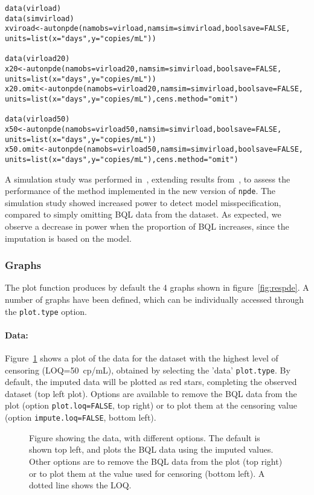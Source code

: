 \begin{verbatim}
data(virload)
data(simvirload)
xviroad<-autonpde(namobs=virload,namsim=simvirload,boolsave=FALSE, 
units=list(x="days",y="copies/mL"))

data(virload20)
x20<-autonpde(namobs=virload20,namsim=simvirload,boolsave=FALSE, 
units=list(x="days",y="copies/mL"))
x20.omit<-autonpde(namobs=virload20,namsim=simvirload,boolsave=FALSE, 
units=list(x="days",y="copies/mL"),cens.method="omit")

data(virload50)
x50<-autonpde(namobs=virload50,namsim=simvirload,boolsave=FALSE, 
units=list(x="days",y="copies/mL"))
x50.omit<-autonpde(namobs=virload50,namsim=simvirload,boolsave=FALSE, 
units=list(x="days",y="copies/mL"),cens.method="omit")
\end{verbatim}

A simulation study was performed in~\cite{Nguyen2012}, extending results from~\cite{Nguyen2012}, to assess the performance of the method implemented in the new version of \texttt{npde}. The simulation study showed increased power to detect model misspecification, compared to simply omitting BQL data from the dataset. As expected, we observe a decrease in power when the proportion of BQL increases, since the imputation is based on the model.

\subsubsection{Graphs}

\hskip 18pt The plot function produces by default the 4 graphs shown in figure~\ref{fig:respde}. A number of graphs have been defined, which can be individually accessed through the \texttt{plot.type} option.

\paragraph{Data:} Figure~\ref{fig:x50.data} shows a plot of the data for the dataset with the highest level of censoring (LOQ=50~cp/mL), obtained by selecting the 'data' \texttt{plot.type}. By default, the imputed data will be plotted as red stars, completing the observed dataset (top left plot). Options are available to remove the BQL data from the plot (option \texttt{plot.loq=FALSE}, top right) or to plot them at the censoring value (option \texttt{impute.loq=FALSE}, bottom left). 

\begin{figure}[!h]
\par\kern -0.3cm
\begin{center}
\end{center}
\caption{Figure showing the data, with different options. The default is shown top left, and plots the BQL data using the imputed values. Other options are to remove the BQL data from the plot (top right) or to plot them at the value used for censoring (bottom left). A dotted line shows the LOQ.}\label{fig:x50.data}
\end{figure}

